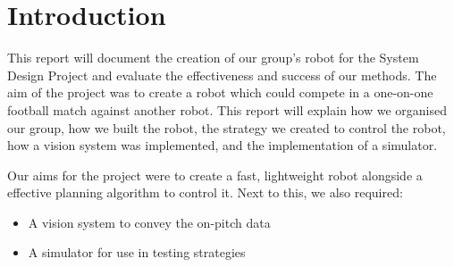 \section{Introduction}

This report will document the creation of our group’s robot for the System Design Project and evaluate the effectiveness and success of our methods. 
The aim of the project was to create a robot which could compete in a one-on-one football match against another robot. This report will explain how we organised our group, how we built the robot, the strategy we created to control the robot, how a vision system was implemented, and the implementation of a simulator.

Our aims for the project were to create a fast, lightweight robot alongside a effective planning algorithm to control it. Next to this, we also required:
\begin{itemize}
\item A vision system to convey the on-pitch data
\item A simulator for use in testing strategies
\end{itemize}

